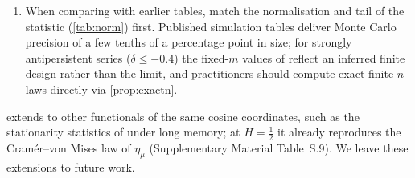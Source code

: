 \begin{enumerate}
or below \,\% in every design at $n=500$ and cuts the worst case at $n=100$ from
\,\% to \,\%, at a median cost of
 percentage points of power (\cref{sec:competitors}). For the four-frequency test, exact local Whittle brings size closer to nominal in the simulated designs with
$H>\frac12$ and no positive short-run correlation.
\item When comparing with earlier tables, match the normalisation and tail of the statistic (\cref{tab:norm}) first.
Published simulation tables deliver Monte Carlo precision of a few tenths of a percentage point in size; for strongly
antipersistent series ($\delta\le-0.4$) the fixed-$m$ values of \citet{HI17} reflect an inferred finite design rather
than the limit, and practitioners should compute exact finite-$n$ laws directly via \cref{prop:exactn}.
\end{enumerate}
\CosCert{} extends to other functionals of the same cosine coordinates, such as the stationarity statistics of
\citet{KPSS92} under long memory; at $H=\frac12$ it already reproduces the Cram\'er--von Mises law of $\eta_\mu$
(Supplementary Material Table~S.9). We leave these extensions to future work.
